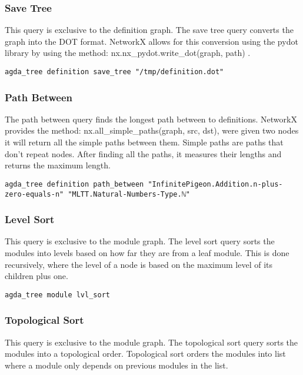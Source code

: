 \subsubsection{Save Tree}

This query is exclusive to the definition graph. The save tree query converts
the graph into the DOT format. NetworkX allows for this conversion using the
pydot library by using the method: \textsf{nx.nx\_pydot.write\_dot(graph, path) }.

\begin{lstlisting}
agda_tree definition save_tree "/tmp/definition.dot"
\end{lstlisting}

\subsubsection{Path Between}

The path between query finds the longest path between to definitions. NetworkX
provides the method: \textsf{nx.all\_simple\_paths(graph, src, dst)}, were given
two nodes it will return all the simple paths between them. Simple paths are
paths that don't repeat nodes. After finding all the paths, it measures their
lengths and returns the maximum length.

\begin{lstlisting}
agda_tree definition path_between "InfinitePigeon.Addition.n-plus-zero-equals-n" "MLTT.Natural-Numbers-Type.ℕ"
\end{lstlisting}

\subsubsection{Level Sort}

This query is exclusive to the module graph. The level sort query sorts the
modules into levels based on how far they are from a leaf module. This is done
recursively, where the level of a node is based on the maximum level of its
children plus one.

\begin{lstlisting}
agda_tree module lvl_sort
\end{lstlisting}

\subsubsection{Topological Sort}

This query is exclusive to the module graph. The topological sort query sorts
the modules into a topological order. Topological sort orders the modules into
list where a module only depends on previous modules in the list.


